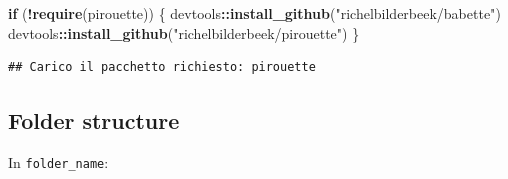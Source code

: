 \documentclass[]{article}
\newenvironment{Shaded}{\begin{snugshade}}{\end{snugshade}}
\newcommand{\KeywordTok}[1]{\textcolor[rgb]{0.13,0.29,0.53}{\textbf{#1}}}
\newcommand{\StringTok}[1]{\textcolor[rgb]{0.31,0.60,0.02}{#1}}
\newcommand{\ControlFlowTok}[1]{\textcolor[rgb]{0.13,0.29,0.53}{\textbf{#1}}}
\newcommand{\OperatorTok}[1]{\textcolor[rgb]{0.81,0.36,0.00}{\textbf{#1}}}
\newcommand{\NormalTok}[1]{#1}
\begin{document}
\begin{Shaded}
\begin{Highlighting}[]
\ControlFlowTok{if}\NormalTok{ (}\OperatorTok{!}\KeywordTok{require}\NormalTok{(pirouette)) \{}
\NormalTok{  devtools}\OperatorTok{::}\KeywordTok{install_github}\NormalTok{(}\StringTok{"richelbilderbeek/babette"}\NormalTok{)}
\NormalTok{  devtools}\OperatorTok{::}\KeywordTok{install_github}\NormalTok{(}\StringTok{"richelbilderbeek/pirouette"}\NormalTok{)}
\NormalTok{\}}
\end{Highlighting}
\end{Shaded}

\begin{verbatim}
## Carico il pacchetto richiesto: pirouette
\end{verbatim}

\subsection{Folder structure}\label{folder-structure}

In \texttt{folder\_name}:
\end{document}
